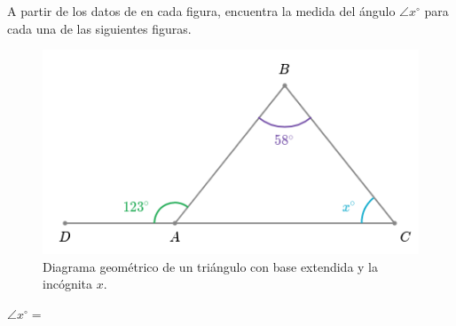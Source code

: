 \question[10] A partir de los datos de en cada figura, encuentra la medida del \'angulo $\angle x^\circ$ para cada una de las siguientes figuras.

\begin{minipage}[b]{0.42\textwidth}
    \begin{figure}[H]
        \includegraphics[width=\linewidth]{Images/triangle_angle_01}
        \caption{Diagrama geométrico de un tri\'angulo con base extendida y la inc\'ognita $x$.}
        \label{fig:triangle_angle_01}
    \end{figure}
    \begin{center}
        {\color{cielo}\textbf{$\angle x^\circ =$}} \fbox{
        \begin{minipage}{2cm}
            \hfill\vspace{0.5cm}
        \end{minipage}
        }
    \end{center}
\end{minipage}
\hspace{1cm}
